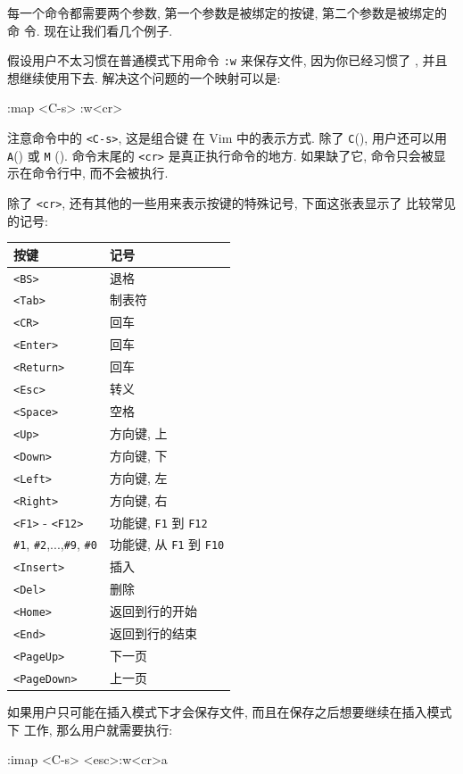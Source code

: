 每一个命令都需要两个参数, 第一个参数是被绑定的按键, 第二个参数是被绑定的命
令. 现在让我们看几个例子.

假设用户不太习惯在普通模式下用命令 \texttt{:w} 来保存文件, 因为你已经习惯了
, 并且想继续使用下去.
解决这个问题的一个映射可以是:
\begin{vimcmd}
:map <C-s> :w<cr>
\end{vimcmd}

注意命令中的 \texttt{<C-s>}, 这是组合键  在 Vim 中的表示方式.
除了 \texttt{C}(), 用户还可以用 \texttt{A}() 或
\texttt{M} (). 命令末尾的 \texttt{<cr>} 是真正执行命令的地方.
如果缺了它, 命令只会被显示在命令行中, 而不会被执行.

除了 \texttt{<cr>}, 还有其他的一些用来表示按键的特殊记号, 下面这张表显示了
比较常见的记号:
\begin{center}
    \begin{tabular}{ll}
        \hline
        按键        & 记号  \\
        \hline
        \texttt{<BS>}   & 退格 \\
        \texttt{<Tab>}   &  制表符 \\
        \texttt{<CR>}   & 回车  \\
        \texttt{<Enter>}   & 回车 \\
        \texttt{<Return>}   & 回车 \\
        \texttt{<Esc>}   & 转义 \\
        \texttt{<Space>}   & 空格 \\
        \texttt{<Up>}   & 方向键, 上 \\
        \texttt{<Down>}   & 方向键, 下 \\
        \texttt{<Left>}   & 方向键, 左 \\
        \texttt{<Right>}   & 方向键, 右 \\
        \texttt{<F1>} - \texttt{<F12>}  & 功能键, \texttt{F1} 到
            \texttt{F12} \\
        \texttt{\#1}, \texttt{\#2},...,\texttt{\#9}, \texttt{\#0}  & 功能键, 从
            \texttt{F1} 到 \texttt{F10} \\
        \texttt{<Insert>}   & 插入 \\
        \texttt{<Del>}   & 删除 \\
        \texttt{<Home>}   & 返回到行的开始 \\
        \texttt{<End>}   & 返回到行的结束 \\
        \texttt{<PageUp>}   & 下一页 \\
        \texttt{<PageDown>}   & 上一页 \\
        \hline
    \end{tabular}
\end{center}

如果用户只可能在插入模式下才会保存文件, 而且在保存之后想要继续在插入模式下
工作, 那么用户就需要执行:
\begin{vimcmd}
:imap <C-s> <esc>:w<cr>a
\end{vimcmd}

